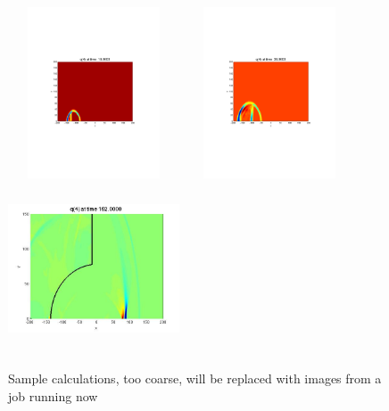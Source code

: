 \documentclass{article}
\begin{document}
\begin{figure}
\begin{center}
\includegraphics[height=2in,width=2in]{reflect1.pdf}
\includegraphics[height=2in,width=2in]{reflect2.pdf}
\includegraphics[height=2in,width=2in]{swallow_tail4.jpg}
\caption{Sample calculations, too coarse, will be replaced with images from a job running now}
\end{center}
\end{figure}
\end{document}

